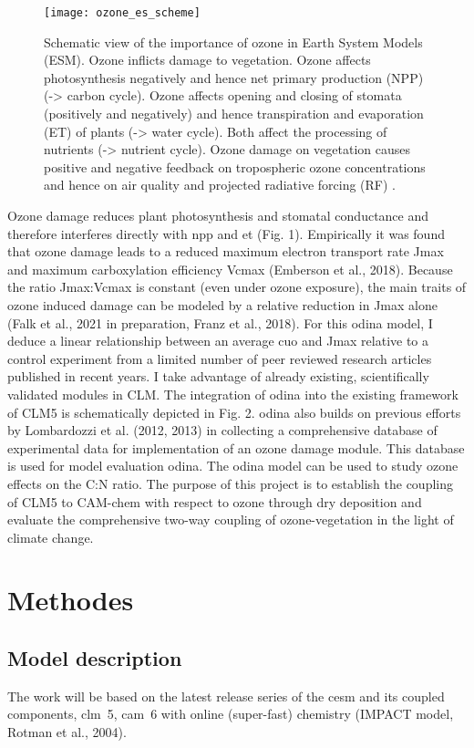 \documentclass[11pt, a4paper, oneside, article]{memoir}
\newcommand{\pcite}[1]{\parencite{#1}}
\begin{document}
\begin{wrapfigure}{R}{0.5\textwidth} %
  \centering
  \texttt{[image: ozone\_es\_scheme]}
  \caption{Schematic view of the importance of ozone in Earth System Models (ESM). Ozone inflicts damage to vegetation. Ozone affects photosynthesis negatively and hence net primary production (NPP) (-> carbon cycle). Ozone affects opening and closing of stomata (positively and negatively) and hence transpiration and evaporation (ET) of plants (-> water cycle). Both affect the processing of nutrients (-> nutrient cycle). Ozone damage on vegetation causes positive and negative feedback on tropospheric ozone concentrations and hence on air quality and projected radiative forcing (RF) \pcite{Nat:Sitch2007}.}
  \label{fig:ozone_es_scheme}
\end{wrapfigure}

Ozone damage reduces plant photosynthesis and stomatal conductance and therefore interferes directly with \gls{npp} and \gls{et} (Fig. 1). Empirically it was found that ozone damage leads to a reduced maximum electron transport rate Jmax and maximum carboxylation efficiency Vcmax (Emberson et al., 2018). Because the ratio Jmax:Vcmax is constant (even under ozone exposure), the main traits of ozone induced damage can be modeled by a relative reduction in Jmax alone (Falk et al., 2021 in preparation, Franz et al., 2018). For this \gls{odina} model, I deduce a linear relationship between an average \gls{cuo} and Jmax relative to a control experiment from a limited number of peer reviewed research articles published in recent years. I take advantage of already existing, scientifically validated modules in CLM. The integration of \gls{odina} into the existing framework of CLM5 is schematically depicted in Fig. 2. \gls{odina} also builds on previous efforts by Lombardozzi et al. (2012, 2013) in collecting a comprehensive database of experimental data for implementation of an ozone damage module. This database is used for model evaluation \gls{odina}. The \gls{odina} model can be used to study ozone effects on the C:N ratio. The purpose of this project is to establish the coupling of CLM5 to CAM-chem with respect to ozone through dry deposition and evaluate the comprehensive two-way coupling of ozone-vegetation in the light of climate change.


\chapter{Methodes}
\section*{Model description}
The work will be based on the latest release series of the \gls{cesm} and its coupled components, \gls{clm}~5, \gls{cam}~6 with online (super-fast) chemistry (IMPACT model, Rotman et al., 2004).
\end{document}
